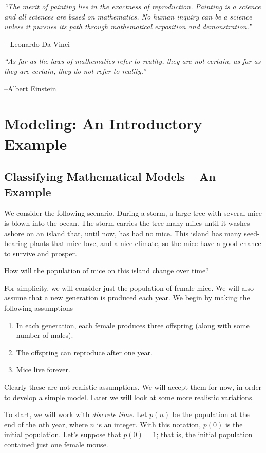 \documentclass[reqno]{immbook}
\numberwithin{equation}{chapter}
\numberwithin{question}{section}
\numberwithin{theorem}{chapter}
\numberwithin{figure}{chapter}
\theoremstyle{definition}
\begin{document}
\bigskip
\noindent
\emph{``The merit of painting lies in the exactness of reproduction.
      Painting is a science and all sciences are based on mathematics. 
      No human inquiry can be a science unless it pursues its path
      through mathematical exposition and demonstration.''}

\hfill -- Leonardo Da Vinci

\bigskip
\noindent
\emph{``As far as the laws of mathematics refer to reality, they are not
certain, as far as they are certain, they do not refer to reality.''}

\hfill  --Albert Einstein

%
%
\newpage

\section{Modeling: An Introductory Example}

\subsection*{Classifying Mathematical Models -- An Example}
We consider the following scenario.
During a storm, a large tree with several
mice is blown into the ocean.  The storm carries the
tree many miles until it washes ashore on an
island that, until now, has had no mice.
This island has many seed-bearing plants that
mice love, and a nice climate, so the mice
have a good chance to survive and prosper.

How will the population of mice on this island
change over time?

For simplicity, we will consider just the population of female
mice.
We will also assume that a new generation is produced
each year.
We begin by making the following assumptions
\begin{enumerate}
\item In each generation, each female produces three offspring
(along with some number of males).
\item The offspring can reproduce after one year.
\item Mice live forever.
\end{enumerate}
Clearly these are not realistic assumptions.
We will accept them for now, in order to develop
a simple model.  Later we will look at some more
realistic variations.

To start, we will work with
\emph{discrete time}.
Let $p(n)$ be the population at the end of the
$n$th year, where $n$ is an integer.
With this notation, $p(0)$ is the initial population.
Let's suppose that $p(0)=1$; that is, the initial
population contained just one female mouse.
\end{document}
